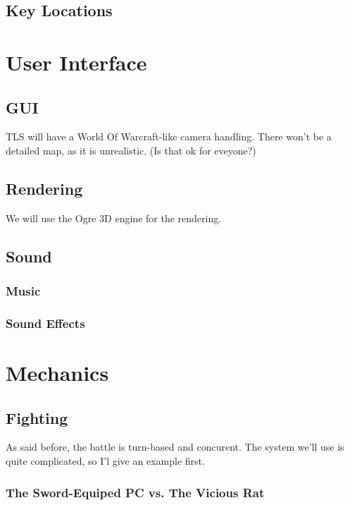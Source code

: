 \documentclass[a4paper]{report}
\begin{document}
	\chapter{Key Locations}

\part{User Interface}

	\chapter{GUI}

		TLS will have a World Of Warcraft-like camera handling. There won't be a detailed map, as it is unrealistic. (Is that ok for eveyone?)

	\chapter{Rendering}

		We will use the Ogre 3D engine for the rendering.

	\chapter{Sound}

		\section{Music}

		\section{Sound Effects}

\part{Mechanics}

	\chapter{Fighting}

		As said before, the battle is turn-based and concurent. The system  we'll use is quite complicated, so I'l give an example first.

		\section{The Sword-Equiped PC vs. The Vicious Rat}
\end{document}
